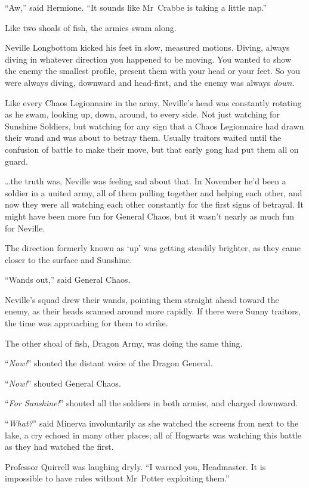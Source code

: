 “Aw,” said Hermione.
“It sounds like Mr~Crabbe is taking a little nap.”

\later

Like two shoals of fish, the armies swam along.

Neville Longbottom kicked his feet in slow, measured motions. Diving, always diving in whatever direction you happened to be moving. You wanted to show the enemy the smallest profile, present them with your head or your feet. So you were always diving, downward and head-first, and the enemy was always \emph{down}.

Like every Chaos Legionnaire in the army, Neville’s head was constantly rotating as he swam, looking up, down, around, to every side. Not just watching for Sunshine Soldiers, but watching for any sign that a Chaos Legionnaire had drawn their wand and was about to betray them. Usually traitors waited until the confusion of battle to make their move, but that early gong had put them all on guard.

…the truth was, Neville was feeling sad about that. In November he’d been a soldier in a united army, all of them pulling together and helping each other, and now they were all watching each other constantly for the first signs of betrayal. It might have been more fun for General Chaos, but it wasn’t nearly as much fun for Neville.

The direction formerly known as ‘up’ was getting steadily brighter, as they came closer to the surface and Sunshine.

“Wands out,” said General Chaos.

Neville’s squad drew their wands, pointing them straight ahead toward the enemy, as their heads scanned around more rapidly. If there were Sunny traitors, the time was approaching for them to strike.

The other shoal of fish, Dragon Army, was doing the same thing.

“\emph{Now!}” shouted the distant voice of the Dragon General.

“\emph{Now!}” shouted General Chaos.

“\emph{For Sunshine!}” shouted all the soldiers in both armies, and charged downward.

\later

“\emph{What?}” said Minerva involuntarily as she watched the screens from next to the lake, a cry echoed in many other places; all of Hogwarts was watching this battle as they had watched the first.

Professor Quirrell was laughing dryly.
“I warned you, Headmaster. It is impossible to have rules without Mr~Potter exploiting them.”

